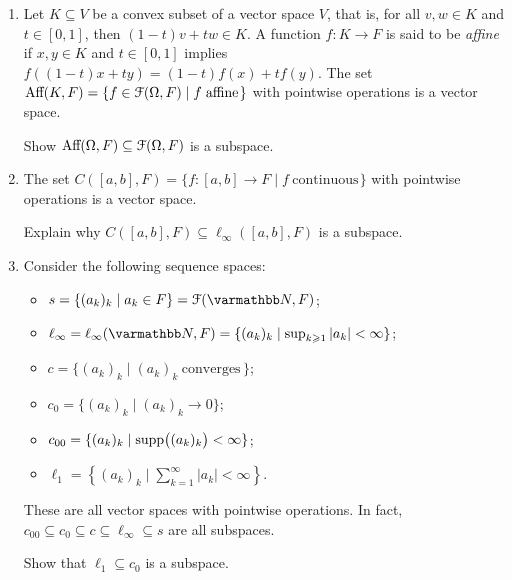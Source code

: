 \begin{example}
\begin{enumerate}[label = (\arabic*),itemsep=1pt,topsep=3pt]
            \item Let $K \subseteq V$ be a convex subset of a vector space $V$, that is, for all $v,w \in K$ and $t \in [0,1]$, then $(1-t)v + tw \in K$. A function $f:K \rightarrow F$ is said to be \textit{affine} if $x,y \in K$ and $t \in [0,1]$ implies $f((1-t)x + ty) = (1-t)f(x) + tf(y)$. The set \newline $\text{Aff}(K,F) = \{f \in \mathcal{F}(\Omega,F) \mid f \hspace{3pt}\text{affine}\hspace{1pt}\}$ with pointwise operations is a vector space.
                \begin{exercise}
                    Show $\text{Aff}(\Omega,F) \subseteq \mathcal{F}(\Omega,F)$ is a subspace.
                \end{exercise}
            \item The set $C([a,b],F) = \{f:[a,b] \rightarrow F \mid f \hspace{3pt}\text{continuous}\hspace{1pt}\}$ with pointwise operations is a vector space.
                \begin{exercise}
                    Explain why $C([a,b],F) \subseteq \ell_\infty([a,b],F)$ is a subspace.
                \end{exercise}
            \item Consider the following sequence spaces:
                \begin{itemize}
                    \item $s = \{(a_k)_k \mid a_k \in F\} = \cF(\bfN,F)$;
                    \item $\ell_\infty = \ell_\infty(\bfN,F) = \{(a_k)_k \mid \sup_{k \geq 1}|a_k| < \infty\}$;
                    \item $c = \{(a_k)_k \mid (a_k)_k \hspace{3pt}\text{converges}\hspace{2pt}\}$;
                    \item $c_0 = \{(a_k)_k \mid (a_k)_k \rightarrow 0\}$;
                    \item $c_{00} = \{(a_k)_k \mid \operatorname{supp}\bigl((a_k)_k\bigr) < \infty\}$;
                    \item $\ell_1 = \left\{ (a_k)_k \mid \sum_{k = 1}^\infty |a_k| < \infty \right\}$.
                \end{itemize}
            These are all vector spaces with pointwise operations. In fact, $c_{00} \subseteq c_0 \subseteq c \subseteq \ell_\infty \subseteq s$ are all subspaces.
                \begin{exercise}
                    Show that $\ell_1 \subseteq c_0$ is a subspace.
                \end{exercise}


\end{enumerate}
\end{example}
